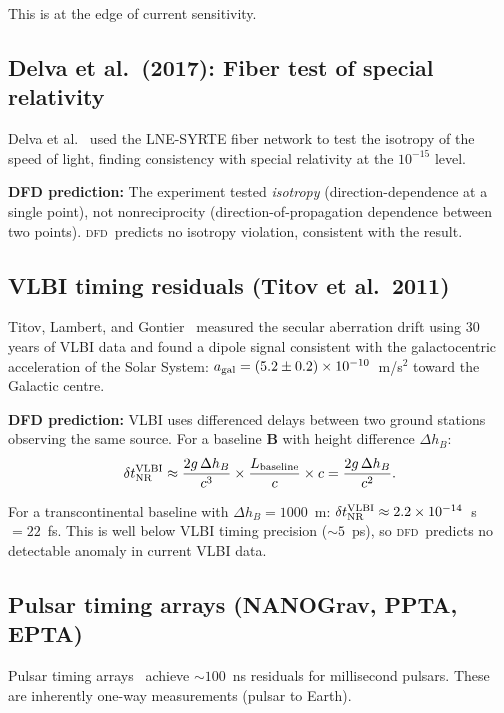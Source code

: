 \documentclass[aps,prl,twocolumn,superscriptaddress,showpacs]{revtex4-2}
\newcommand{\DFD}{\textsc{dfd}}
\begin{document}
This is at the edge of current sensitivity.

\subsection{Delva et al.\ (2017): Fiber test of special relativity}

Delva et al.~\cite{Delva2017} used the LNE-SYRTE fiber network
to test the isotropy of the speed of light, finding consistency
with special relativity at the $10^{-15}$ level.

\textbf{DFD prediction:}  The experiment tested \emph{isotropy}
(direction-dependence at a single point), not nonreciprocity
(direction-of-propagation dependence between two points).
\DFD\ predicts no isotropy violation, consistent with the result.

\subsection{VLBI timing residuals (Titov et al.\ 2011)}

Titov, Lambert, and Gontier~\cite{Titov2011} measured the secular
aberration drift using 30 years of VLBI data and found a dipole
signal consistent with the galactocentric acceleration of the
Solar System: $a_{\rm gal} = (5.2\pm 0.2)\times 10^{-10}$~m/s$^2$
toward the Galactic centre.

\textbf{DFD prediction:}  VLBI uses differenced delays between
two ground stations observing the same source.  For a baseline
$\mathbf{B}$ with height difference $\Delta h_B$:
\begin{equation}
\delta t_{\rm NR}^{\rm VLBI} \approx \frac{2g\,\Delta h_B}{c^3}
\times \frac{L_{\rm baseline}}{c}\times c = \frac{2g\,\Delta h_B}{c^2}.
\end{equation}

For a transcontinental baseline with $\Delta h_B = 1000$~m:
$\delta t_{\rm NR}^{\rm VLBI} \approx 2.2\times 10^{-14}$~s $= 22$~fs.
This is well below VLBI timing precision ($\sim 5$~ps), so
\DFD\ predicts no detectable anomaly in current VLBI data.

\subsection{Pulsar timing arrays (NANOGrav, PPTA, EPTA)}

Pulsar timing arrays~\cite{NANOGrav2023} achieve $\sim 100$~ns
residuals for millisecond pulsars.  These are inherently one-way
measurements (pulsar to Earth).
\end{document}
